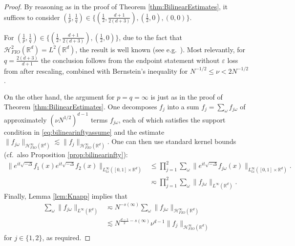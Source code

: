 \documentclass{amsart}
\numberwithin{equation}{section}
\theoremstyle{definition}
\newcommand{\R}{\mathbb{R}}
\newcommand{\Rd}{\mathbb{R}^{d}}
\newcommand{\Rn}{\mathbb{R}^{d}}
\newcommand {\HT}{\mathcal{H}}
\newcommand {\veps}{\varepsilon}
\newcommand {\w}{\omega}
\begin{document}
\begin{proof}
By reasoning as in the proof of Theorem \ref{thm:BilinearEstimates}, it suffices to consider $(\frac{1}{p},\frac{1}{q})\in\{(\frac{1}{2},\frac{d+1}{2(d+3)}), (\frac{1}{2},0),(0,0)\}$.  

For $(\frac{1}{p},\frac{1}{q})\in\{(\frac{1}{2},\frac{d+1}{2(d+3)}), (\frac{1}{2},0)\}$, due to the fact that $\HT^{2}_{FIO}(\Rn)=L^{2}(\Rn)$, the result is well known (see e.g.~\cite[Theorem 2.2]{ChLeLi26}). Most relevantly, for $q=\frac{2(d+3)}{d+1}$ the conclusion follows from the endpoint statement without $\veps$ loss from \cite{Tao01} after rescaling, combined with Bernstein's inequality for $N^{-1/2}\leq\nu<2N^{-1/2}$.  

On the other hand, the argument for $p=q=\infty$ is just as in the proof of Theorem \ref{thm:BilinearEstimates}. One decomposes $f_{j}$ into a sum $f_{j}=\sum_{\w} f_{j\w}$ of approximately $(\nu N^{1/2})^{d-1}$ terms $f_{j\w}$, each of which satisfies the support condition in \eqref{eq:bilinearinftyassume} and the estimate $\|f_{j\w}\|_{\HT^{\infty}_{FIO}(\Rd)}\lesssim \|f_{j}\|_{\HT^{\infty}_{FIO}(\Rd)}$. One can then use standard kernel bounds (cf.~also Proposition \ref{prop:bilinearinfty}):
\begin{align*}
\big\|e^{it\sqrt{-\Delta}}f_{1}(x)e^{it\sqrt{-\Delta}}f_{2}(x)\big\|_{L_{tx}^{\infty}([0,1] \times \R^d)}&\leq %
\prod_{j=1}^{2}\sum_{\w}\|e^{it\sqrt{-\Delta}}f_{j\w}(x)\|_{L_{tx}^{\infty}([0,1] \times \R^d)}.\\%
&\eqsim \prod_{j=1}^{2}\sum_{\w}\|f_{j\w}\|_{L^{\infty}(\R^d)}.
\end{align*}
Finally, Lemma \ref{lem:Knapp} implies that \begin{equation}\label{eq:Knappbilinear}
\begin{aligned}
\sum_{\w}\|f_{j\w}\|_{L^{\infty}(\R^d)}&\eqsim N^{-s(\infty)}\sum_{\w}\|f_{j\w}\|_{\HT^{\infty}_{FIO}(\Rd)}\\
&\lesssim N^{\frac{d-1}{2}-s(\infty)}\nu^{d-1}\|f_{j}\|_{\HT^{\infty}_{FIO}(\Rd)}%
\end{aligned}
\end{equation}
for $j\in\{1,2\}$, as required.
\end{proof}
\end{document}
